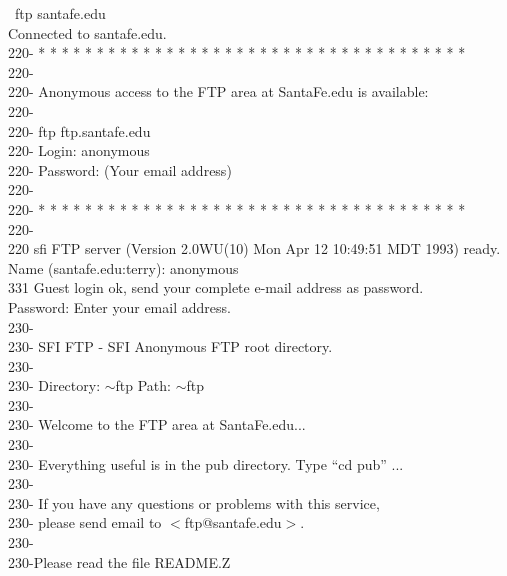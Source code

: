\vspace{0.5in}
\noindent
\begin{sl}
\prompt\ {\sf ftp santafe.edu}                                                  \\
Connected to santafe.edu.                                                       \\
220-  * * * * * * * * * * * * * * * * * * * * * * * * * * * * * * * * * * * * * \\
220-										\\
220-   Anonymous access to the FTP area at SantaFe.edu is available:		\\
220-										\\
220-   ftp ftp.santafe.edu							\\
220-   Login: anonymous								\\
220-   Password: (Your email address)						\\
220-										\\
220-  * * * * * * * * * * * * * * * * * * * * * * * * * * * * * * * * * * * * *	\\
220-										\\
220 sfi FTP server (Version 2.0WU(10) Mon Apr 12 10:49:51 MDT 1993) ready.	\\
Name (santafe.edu:terry): {\sf anonymous}               			\\
331 Guest login ok, send your complete e-mail address as password.		\\
Password: {\sf Enter your email address.}					\\
230-										\\
230-  SFI FTP - SFI Anonymous FTP root directory.				\\
230-										\\
230-  Directory: $\sim$ftp           Path: $\sim$ftp				\\
230-										\\
230-    Welcome to the FTP area at SantaFe.edu...				\\
230-										\\
230-    Everything useful is in the pub directory.  Type ``cd pub'' ...		\\
230-										\\
230-    If you have any questions or problems with this service,		\\
230-    please send email to $<$ftp@santafe.edu$>$.				\\
230-										\\
230-Please read the file README.Z						\\

\end{sl}
